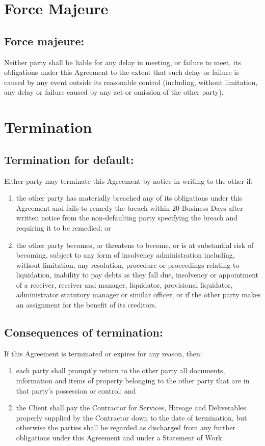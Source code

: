 \documentclass[a4paper,12pt]{article}
\begin{document}
\section{Force Majeure}
\subsection{Force majeure:}  Neither party shall be liable for any delay in meeting, or failure to meet, its obligations under this Agreement to the extent that such delay or failure is caused by any event outside its reasonable control (including, without limitation, any delay or failure caused by any act or omission of the other party).

\section{Termination}
\subsection{Termination for default:}  Either party may terminate this Agreement by notice in writing to the other if:
\begin{enumerate}
\item the other party has materially breached any of its obligations under this Agreement and fails to remedy the breach within 20 Business Days after written notice from the non-defaulting party specifying the breach and requiring it to be remedied; or
\item the other party becomes, or threatens to become, or is at substantial risk of becoming, subject to any form of insolvency administration including, without limitation, any resolution, procedure or proceedings relating to liquidation, inability to pay debts as they fall due, insolvency or appointment of a receiver, receiver and manager, liquidator, provisional liquidator, administrator statutory manager or similar officer, or if the other party makes an assignment for the benefit of its creditors.
\end{enumerate}

\subsection{Consequences of termination:}  If this Agreement is terminated or expires for any reason, then:
\begin{enumerate}
\item each party shall promptly return to the other party all documents, information and items of property belonging to the other party that are in that party’s possession or control; and
\item the Client shall pay the Contractor for Services, Hireage and Deliverables properly supplied by the Contractor down to the date of termination, but otherwise the parties shall be regarded as discharged from any further obligations under this Agreement and under a Statement of Work.  
\end{enumerate}
\end{document}
